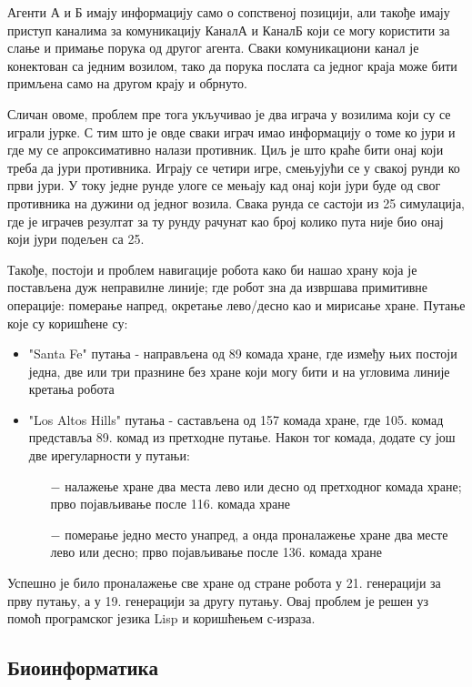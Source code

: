 \documentclass[a4paper]{article}
\begin{document}
Агенти А и Б имају информацију само о сопственој позицији, али такође имају приступ каналима за комуникацију КаналА и КаналБ који се могу користити за слање и примање порука од другог агента. Сваки комуникациони канал је конектован са једним возилом, тако да порука послата са једног краја може бити примљена само на другом крају и обрнуто. \cite{robo0}

Сличан овоме, проблем пре тога укључивао је два играча у возилима који су се играли јурке. С тим што је овде сваки играч имао информацију о томе ко јури и где му се апроксимативно налази противник. Циљ је што краће бити онај који треба да јури противника. Играју се четири игре, смењујући се у свакој рунди ко први јури. У току једне рунде улоге се мењају кад онај који јури буде од свог противника на дужини од једног возила. Свака рунда се састоји из 25 симулација, где је играчев резултат за ту рунду рачунат као број колико пута није био онај који јури подељен са 25. \cite{robo1}

Такође, постоји и проблем навигације робота како би нашао храну која је постављена дуж неправилне линије; где робот зна да извршава примитивне операције: померање напред, окретање лево/десно као и мирисање хране. Путање које су коришћене су:
\begin{itemize}
	\item "Santa Fe" путања - направљена од 89 комада хране, где између њих постоји једна, две или три празнине без хране који могу бити и на угловима линије кретања робота
	\item "Los Altos Hills" путања - састављена од 157 комада хране, где 105. комад представља 89. комад из претходне путање. Након тог комада, додате су још две ирегуларности у путањи:
	\begin{itemize}
		\item[$-$] налажење хране два места лево или десно од претходног комада хране; прво појављивање после 116. комада хране 
		\item[$-$] померање једно место унапред, а онда проналажење хране два месте лево или десно; прво појављивање после 136. комада хране
	\end{itemize}
\end{itemize}
Успешно је било проналажење све хране од стране робота у 21. генерацији за прву путању, а у 19. генерацији за другу путању. \cite{robo2} Овај проблем је решен уз помоћ програмског језика Lisp и коришћењем с-израза. \cite{lisp}
\subsection{Биоинформатика}
\end{document}
